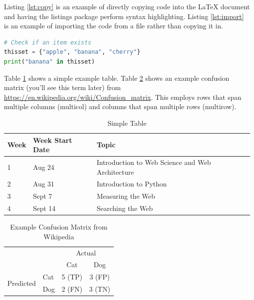 \documentclass[12pt]{article}
\begin{document}
Listing \ref{lst:copy} is an example of directly copying code into the LaTeX document and having the listings package perform syntax highlighting. Listing \ref{lst:import} is an example of importing the code from a file rather than copying it in.

\begin{lstlisting}[language=Python, caption=Python example of checking if an item exists in a set, label=lst:copy]
# Check if an item exists
thisset = {"apple", "banana", "cherry"}
print("banana" in thisset)
\end{lstlisting}



Table \ref{tbl:simple} shows a simple example table.  Table \ref{tbl:confusion} shows an example confusion matrix (you'll see this term later) from \url{https://en.wikipedia.org/wiki/Confusion_matrix}. This employs rows that span multiple columns (multicol) and columns that span multiple rows (multirow). 

\begin{table}[h]
\centering
\caption{Simple Table}
\label{tbl:simple}
\begin{tabular}{|l|l|l|}
\hline
\textbf{Week} & \textbf{Week Start Date} & \textbf{Topic} \\ \hline \hline
1 & Aug 24 & Introduction to Web Science and Web Architecture \\ \hline
2 & Aug 31 & Introduction to Python \\ \hline
3 & Sept 7 & Measuring the Web \\ \hline
4 & Sept 14 & Searching the Web \\ \hline
\end{tabular}
\end{table}

\begin{table}[h]
\centering
\caption{Example Confusion Matrix from Wikipedia}
\label{tbl:confusion}
\begin{tabular}{l|l|c|c|}
\multicolumn{2}{c}{}&\multicolumn{2}{c}{Actual}\\
\cline{3-4}
\multicolumn{2}{c|}{}&Cat&Dog\\
\cline{2-4}
\multirow{2}{*}{Predicted}& Cat & 5 (TP) & 3 (FP)\\
\cline{2-4}
& Dog & 2 (FN) & 3 (TN) \\
\cline{2-4}
\end{tabular}
\end{table}
\end{document}
